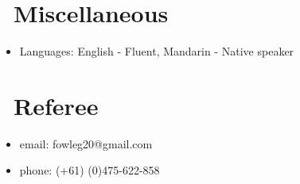 \documentclass{resume}
\begin{document}
\section{\faInfo\ Miscellaneous}
\begin{itemize}[parsep=0.5ex]
  \item Languages: English - Fluent, Mandarin - Native speaker
\end{itemize}


\section{\faFax\ Referee}
\begin{itemize}[parsep=0.5ex]
  \item email: fowleg20@gmail.com
  \item phone: (+61) (0)475-622-858
\end{itemize}
%
%
\end{document}
